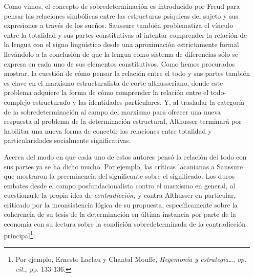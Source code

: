 Como vimos, el concepto de sobredeterminación es introducido por Freud para pensar las relaciones simbólicas entre las estructuras psíquicas del sujeto y sus expresiones a través de los sueños. Saussure también problematiza el vínculo entre la totalidad y sus partes constitutivas al intentar comprender la relación de la lengua con el signo lingüístico desde una aproximación estrictamente formal llevándolo a la conclusión de que la lengua como sistema de diferencias sólo se expresa en cada uno de sus elementos constitutivos. Como hemos procurados mostrar, la cuestión de cómo pensar la relación entre el todo y sus partes también es clave en el marxismo estructuralista de corte althusseriano, donde este problema adquiere la forma de cómo comprender la relación entre el todo-complejo-estructurado y las identidades particulares. Y, al trasladar la categoría de la sobredeterminación al campo del marxismo para ofrecer una nueva respuesta al problema de la determinación estructural, Althusser terminará por habilitar una nueva forma de concebir las relaciones entre totalidad y particularidades socialmente significativas.

Acerca del modo en que cada uno de estos autores pensó la relación del todo con sus partes ya se ha dicho mucho. Por ejemplo, las críticas lacanianas a Saussure que mostraron la preeminencia del significante sobre el significado. Los duros embates desde el campo posfundacionalista contra el marxismo en general, al cuestionarle la propia idea de \emph{contradicción,} y contra Althusser en particular, criticado por la inconsistencia lógica de su propuesta, específicamente sobre la coherencia de su tesis de la determinación en última instancia por parte de la economía con su lectura sobre la condición sobredeterminada de la contradicción principal\footnote{Por ejemplo, Ernesto Laclau y Chantal Mouffe, \emph{Hegemonía y estrategia}\ldots, \emph{op. cit}., pp. 133-136.}.

